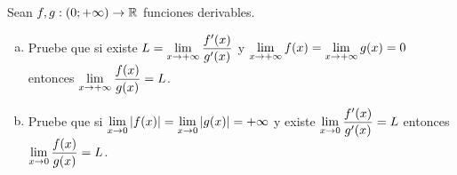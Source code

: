 
Sean $f,g:(0;+\infty)\to\mathbb{R}$ funciones derivables.

\begin{enumerate}[a)]

	\item Pruebe que si existe $L = \limite{x}{\frac{f'(x)}{g'(x)}}$ y $\limite{x}{f(x)} = \limite{x}{g(x)} = 0$ entonces $\limite{x}{\frac{f(x)}{g(x)}} = L$.

	\item Pruebe que si $\limite{x}[0]{|f(x)|} = \limite{x}[0]{|g(x)|} = \pinf$ y existe $\limite{x}[0]{\frac{f'(x)}{g'(x)}} = L$ entonces $\limite{x}[0]{\frac{f(x)}{g(x)}} = L$.

\end{enumerate}